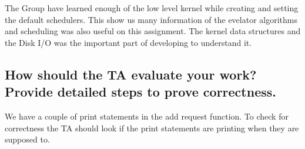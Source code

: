 \documentclass[onecolumn, draftclsnofoot, 10pt, titlepage, compsoc]{IEEEtran}
\begin{document}
The Group have learned enough of the low level kernel while creating and setting the default schedulers. This show us many information of the evelator algorithms and scheduling was also useful on this assignment. The kernel data structures and the Disk I/O was the important part of developing to understand it.

\subsection{How should the TA evaluate your work? Provide detailed steps to prove correctness.}
We have a couple of print statements in the add request function. To check for correctness the TA should look if the print statements are printing when they are supposed to.

\nocite{*}


\end{document}
